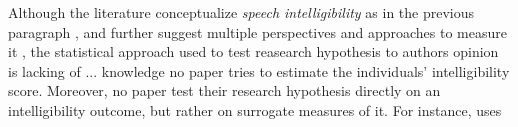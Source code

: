 Although the literature conceptualize \textit{speech intelligibility} as in the previous paragraph \citep{Boonen_et_al_2021}, and further suggest multiple perspectives and approaches to measure it \citep{Boonen_et_al_2020, Boonen_et_al_2021, Hustad_et_al_2020}, the statistical approach used to test reasearch hypothesis to authors opinion is lacking of ... knowledge no paper tries to estimate the individuals' intelligibility score. Moreover, no paper test their research hypothesis directly on an intelligibility outcome, but rather on surrogate measures of it. For instance, \citet{Flipsen_2006} uses 

\begin{comment}
	
The literature suggest two perspectives from which \textit{speech intelligibility} can be assessed: the message and listener's perspective \citep{Boonen_et_al_2020, Boonen_et_al_2021}. The first, also known as acoustic studies, is focused on assessing separately particular characteristics of the speech samples, e.g. their pitch, duration or stress (supra segmental characteristics), or the articulation of vowels and consonants (segmental characteristics) \citep{Rowe_et_al_2018}. Whereas the second, also known as perceptual studies, is centered on making holistic assessments of the speech stimuli, e.g. measure their perceived quality \citep{Boonen_et_al_2020, Boonen_et_al_2021}. On both instances, the stimuli (children's utterances) can be generated from reading at loud, contextualized utterances, or spontaneous speech tasks\footnote{ordered on increasing level of ecological validity \cite{Flipsen_2006, Ertmer_2011}}.

Based on their description, it seems that perceptual are more subjective than acoustic studies, as they do not rely on "objective" measurements, i.e. time duration, wave amplitude, among others, available in the former. However, for the case of SI, there are objective and subjective assessment methodologies.

Furthermore, perceptual studies can use multiple approaches to measure intelligibility, but they can be largely grouped into two: objective and subjective ratings \citep{Hustad_et_al_2020}. In \textit{objective rating} methods, listeners transcribe the children's utterances orthographically or phonetically, and use such information to construct a score. In that sense, in the transcription task, intelligibility can be inferred from the extent a set of transcribers can identify the word contained in an utterance \cite{Boonen_et_al_2021}. In contrast, under \textit{subjective rating} methods, listeners directly infer the utterance's intelligibility score through specific procedures, e.g. absolute holistic, analytic, or comparative judgments, among others. 


\end{comment}
